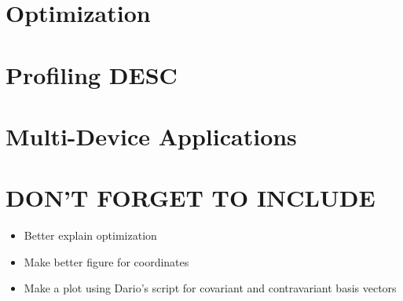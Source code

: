 \documentclass{article}
\begin{document}


\pagebreak
\section{Optimization}






\pagebreak
\section{Profiling DESC}





\pagebreak
\section{Multi-Device Applications}





{\color{blue} \section{DON'T FORGET TO INCLUDE}
\begin{itemize}
    \item Better explain optimization
    \item Make better figure for coordinates
    \item Make a plot using Dario's script for covariant and contravariant basis vectors
\end{itemize}

}







\appendix

\end{document}
